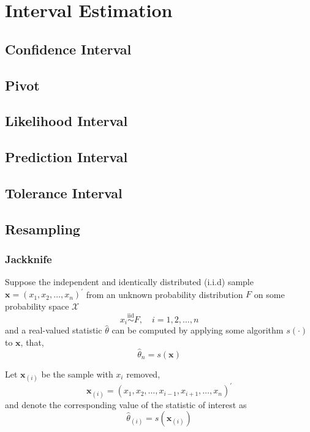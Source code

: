 
\chapter{Interval Estimation}

\section{Confidence Interval}

\section{Pivot}

\section{Likelihood Interval}

\section{Prediction Interval}

\section{Tolerance Interval}

\section{Resampling}

\subsection{Jackknife}

Suppose the independent and identically distributed (i.i.d) sample $\boldsymbol{x}=\left(x_{1},x_{2},\ldots,x_{n}\right)^{\prime}$ from an unknown probability distribution $F$ on some probability space $\mathcal{X}$
\begin{equation}
	x_{i}\stackrel{\text{iid}}{\sim}F,\quad i=1,2,\ldots,n
\end{equation}
and a real-valued statistic $\hat{\theta}$ can be computed by applying some algorithm $s(\cdot)$ to $\mathbf{x}$, that,
\begin{equation}
	\hat{\theta}_{n}=s(\mathbf{x})
\end{equation}

Let $\mathbf{x}_{(i)}$ be the sample with $x_{i}$ removed,
\begin{equation}
	\mathbf{x}_{(i)}=\left(x_{1},x_{2},\ldots,x_{i-1},x_{i+1},\ldots,x_{n}\right)^{\prime}
\end{equation}
and denote the corresponding value of the statistic of interest as
\begin{equation}
	\hat{\theta}_{(i)}=s\left(\mathbf{x}_{(i)}\right)
\end{equation}

